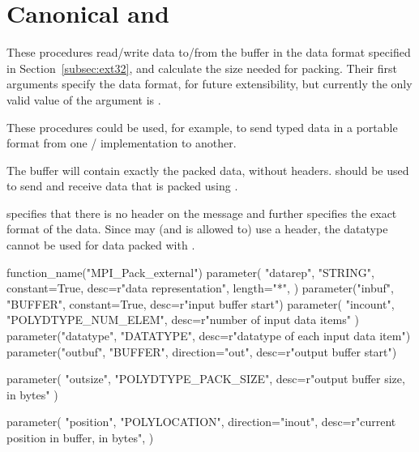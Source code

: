 \section{Canonical \texorpdfstring{}{MPI\_PACK} and \texorpdfstring{}{MPI\_UNPACK}}
\label{canonical_pack}

These procedures read/write data to/from the buffer in the
 data
format specified in Section~\ref{subsec:ext32}, and calculate the size needed
for packing.  Their first arguments specify the data format, for future
extensibility, but
currently
the only valid value of the 
argument is .
\begin{users}
  These procedures could be used, for example, to send typed data in a portable
  format from one \MPI/ implementation to another.
\end{users}

The buffer will contain exactly the packed data, without headers.
 should be used to send and receive data that is packed
using .

\begin{rationale}
 specifies that there is no header on the message
and further
specifies the exact format of the data.  Since  may (and is
allowed
to) use a header, the datatype  cannot be used for data
packed with
.
\end{rationale}

%
\begin{mpi-binding}
    function_name("MPI_Pack_external")
    parameter(
        "datarep",
        "STRING",
        constant=True,
        desc=r"data representation",
        length="*",
    )
    parameter("inbuf", "BUFFER", constant=True, desc=r"input buffer start")
    parameter(
        "incount", "POLYDTYPE_NUM_ELEM", desc=r"number of input data items"
    )
    parameter("datatype", "DATATYPE", desc=r"datatype of each input data item")
    parameter("outbuf", "BUFFER", direction="out", desc=r"output buffer start")

    parameter(
        "outsize", "POLYDTYPE_PACK_SIZE", desc=r"output buffer size, in bytes"
    )

    parameter(
        "position",
        "POLYLOCATION",
        direction="inout",
        desc=r"current position in buffer, in bytes",
    )
\end{mpi-binding}

